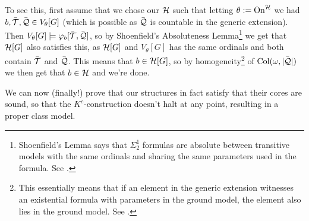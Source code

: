 {To see this, first assume that we chose our $\mathcal{H}$ such that letting $\theta:=\operatorname{On}^{\mathcal{H}}$ we had $b,\bar{\operatorname{\mathcal{T}}},\bar{\operatorname{\mathcal{Q}}}\in V_\theta[G]$ (which is possible as $\bar{\operatorname{\mathcal{Q}}}$ is countable in the generic extension). Then $V_\theta[G]\models\varphi_b[\bar{\operatorname{\mathcal{T}}},\bar{\operatorname{\mathcal{Q}}}]$, so by Shoenfield's Absoluteness Lemma\footnote{Shoenfield's Lemma says that $\Sigma^1_2$ formulas are absolute between transitive models with the same ordinals and sharing the same parameters used in the formula. See \cite{Shoenfield}.} we get that $\mathcal{H}[G]$ also satisfies this, as $\mathcal{H}[G]$ and $V_\theta[G]$ has the same ordinals and both contain $\bar{\operatorname{\mathcal{T}}}$ and $\bar{\operatorname{\mathcal{Q}}}$. This means that $b\in\mathcal{H}[G]$, so by homogeneity\footnote{This essentially means that if an element in the generic extension witnesses an existential formula with parameters in the ground model, the element also lies in the ground model. See \cite{Jech}.} of $\operatorname{Col}(\omega,|\bar{\operatorname{\mathcal{Q}}}|)$ we then get that $b\in\mathcal{H}$ and we're done.
}

We can now (finally!) prove that our structures in fact satisfy that their cores are sound, so that the $K^c$-construction doesn't halt at any point, resulting in a proper class model.

